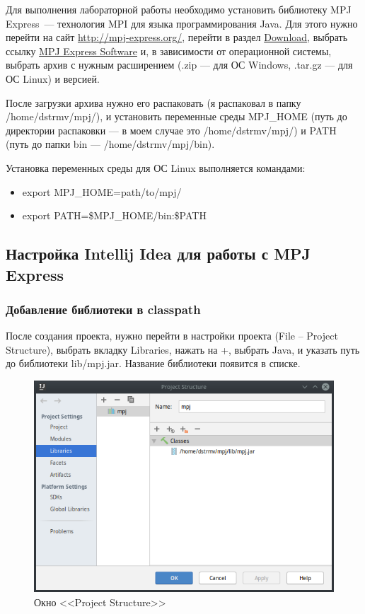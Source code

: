 \documentclass[titlepage,oneside,final,14pt]{extarticle} %
\begin{document}
Для выполнения лабораторной работы необходимо установить библиотеку MPJ Express~--- технология MPI для языка программирования Java.
Для этого нужно перейти на сайт \href{http://mpj-express.org/}{http://mpj-express.org/}, перейти в раздел \href{http://mpj-express.org/download.php}{Download}, выбрать ссылку \href{https://sourceforge.net/projects/mpjexpress/files/releases/}{MPJ Express Software} и, в зависимости от операционной системы, выбрать архив с нужным расширением (.zip --- для ОС Windows, .tar.gz --- для ОС Linux) и версией.

После загрузки архива нужно его распаковать (я распаковал в папку /home/dstrmv/mpj/), и установить переменные среды MPJ\_HOME (путь до директории распаковки --- в моем случае это /home/dstrmv/mpj/) и PATH (путь до папки bin --- /home/dstrmv/mpj/bin).

Установка переменных среды для ОС Linux выполняется командами:
\begin{itemize}
	\ttfamily
	\item export MPJ\_HOME=path/to/mpj/
	\item export PATH=\$MPJ\_HOME/bin:\$PATH
	\normalfont	
\end{itemize}

\subsection{Настройка Intellij Idea для работы с MPJ Express}

\subsubsection{Добавление библиотеки в classpath}

После создания проекта, нужно перейти в настройки проекта (File -- Project Structure), выбрать вкладку Libraries, нажать на +, выбрать Java, и указать путь до библиотеки lib/mpj.jar. Название библиотеки появится в списке.

\begin{figure}[H]
\includegraphics[width=0.9\linewidth]{project_structure.png}
\centering
\caption{Окно <<Project Structure>>}
\end{figure}
\end{document}
